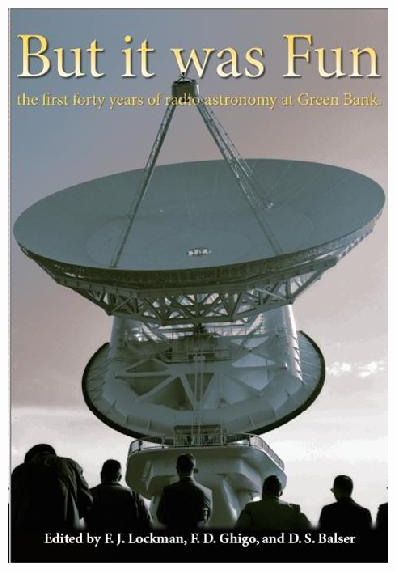 \documentclass[aspectratio=169]{beamer} %
\begin{document}
\begin{frame}{}
\begin{columns}
\begin{column}{0.6\textwidth}
        \end{column}
\begin{column}{0.35\textwidth}
\begin{center}
    \includegraphics[width=1.0\linewidth, height=0.85\textheight]{../images/but_it_was_fun_cover.jpeg}
\end{center}
\end{column}
\end{columns}


\end{frame}
\end{document}
